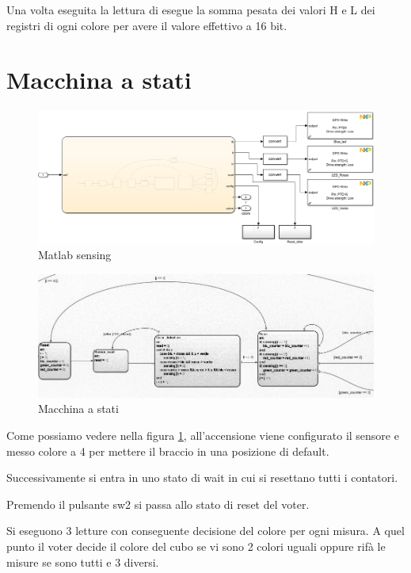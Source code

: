 \documentclass[12pt]{report}
\begin{document}
Una volta eseguita la lettura di esegue la somma pesata dei valori H e L dei registri di ogni colore per avere il valore effettivo a 16 bit.

\section{Macchina a stati}
\begin{figure}

    \includegraphics[width=\textwidth]{Immagini_sensore/Sensing_e_macchina_a_stati.png}
    \caption{Matlab sensing}
    \end{figure}
    
\begin{figure}
    \includegraphics[width=\textwidth]{Immagini_sensore/sensor_chart.png}
    \caption{Macchina a stati}
    \label{fig:stateflow}
\end{figure}

Come possiamo vedere nella figura \ref{fig:stateflow}, all'accensione viene configurato il sensore e messo colore a 4 per mettere il braccio in una posizione di default.

Successivamente si entra in uno stato di wait in cui si resettano tutti i contatori.

Premendo il pulsante sw2 si passa allo stato di reset del voter.

Si eseguono 3 letture con conseguente decisione del colore per ogni misura. A quel punto il voter decide il colore del cubo se vi sono 2 colori uguali oppure rifà le misure se sono tutti e 3 diversi.
\end{document}
